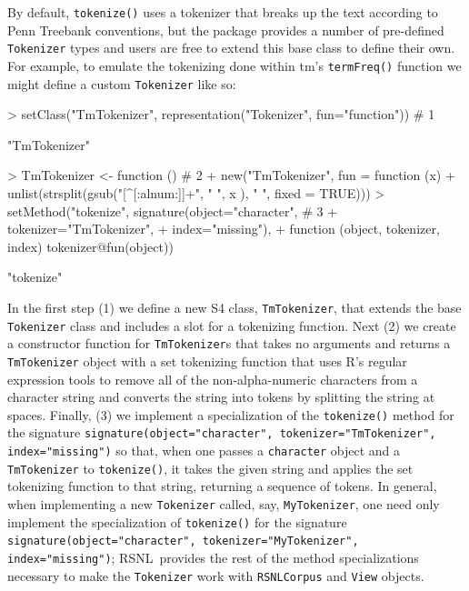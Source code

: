 \documentclass[11pt]{article}
\def\R{\textsf{R}}
\def\RSNL{{\normalfont\fontseries{b}\selectfont RSNL}}
\def\tm{{\normalfont\fontseries{b}\selectfont tm}}
\let\code=\texttt
\let\rclass=\texttt
\begin{document}
By default, \code{tokenize()} uses a tokenizer that breaks up the text
according to Penn Treebank conventions, but the package provides a
number of pre-defined \rclass{Tokenizer} types and users are free to
extend this base class to define their own.  For example, to emulate
the tokenizing done within \tm's \code{termFreq()} function we might
define a custom \rclass{Tokenizer} like so:
\begin{Schunk}
\begin{Sinput}
> setClass("TmTokenizer", representation("Tokenizer", fun="function")) # 1
\end{Sinput}
\begin{Soutput}
[1] "TmTokenizer"
\end{Soutput}
\begin{Sinput}
> TmTokenizer <- function ()                                           # 2
+   new("TmTokenizer", fun = function (x)
+     unlist(strsplit(gsub("[^[:alnum:]]+", " ", x    ), " ", fixed = TRUE)))
> setMethod("tokenize", signature(object="character",                  # 3
+                                 tokenizer="TmTokenizer",
+                                 index="missing"),
+   function (object, tokenizer, index) tokenizer@fun(object))
\end{Sinput}
\begin{Soutput}
[1] "tokenize"
\end{Soutput}
\end{Schunk}
In the first step (1) we define a new S4 class, \rclass{TmTokenizer}, that
extends the base \rclass{Tokenizer} class and includes a slot for a
tokenizing function.  Next (2) we create a constructor function for
\rclass{TmTokenizer}s that takes no arguments and returns a
\rclass{TmTokenizer} object with a set tokenizing function that uses
\R's regular expression tools to remove all of the non-alpha-numeric
characters from a character string and converts the string into
tokens by splitting the string at spaces.  Finally, (3) we
implement a specialization of the \code{tokenize()} method for the
signature \code{signature(object="character", tokenizer="TmTokenizer",
index="missing")} so that, when one passes a \rclass{character} object
and a \rclass{TmTokenizer} to \code{tokenize()}, it takes the given string
and applies the set tokenizing function to that string, returning a
sequence of tokens.  In general, when implementing a new
\rclass{Tokenizer} called, say, \rclass{MyTokenizer}, one need only
implement the specialization of \code{tokenize()} for the signature
\code{signature(object="character", tokenizer="MyTokenizer",
index="missing")}; \RSNL\ provides the rest of the method
specializations necessary to make the \rclass{Tokenizer} work with
\rclass{RSNLCorpus} and \rclass{View} objects.
\end{document}
